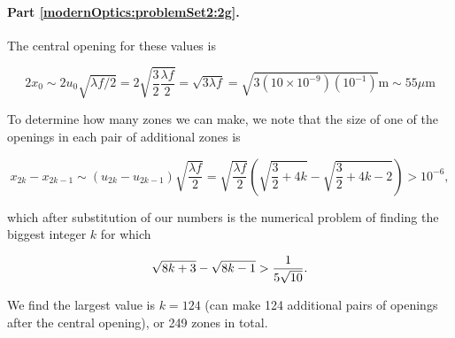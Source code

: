{\paragraph{Part \ref{modernOptics:problemSet2:2g}.  }

The central opening for these values is

\begin{dmath}\label{eqn:modernOptics:ProblemSet2:P2:340}
2 x_0 
\sim 2 u_0 \sqrt{ \lambda f/2 }
= 2 \sqrt{ \frac{3}{2} \frac{\lambda f}{2} }
= \sqrt{ 3 \lambda f }
= \sqrt{ 3 (10 \times 10^{-9})(10^{-1}) } \text{m}
\sim 55 \mu \text{m}
\end{dmath}

To determine how many zones we can make, we note that the size of one of the openings in each pair of additional zones is

\begin{dmath}\label{eqn:modernOptics:ProblemSet2:P2:360}
x_{2k} - x_{2k-1} 
\sim 
(u_{2k} - u_{2k-1} ) 
\sqrt{ \frac{\lambda f}{2} } 
=
\sqrt{ \frac{\lambda f}{2} } 
\left( 
\sqrt{ \frac{3}{2} + 4 k }
-\sqrt{ \frac{3}{2} + 4 k - 2 }
\right) > 10^{-6},
\end{dmath}

which after substitution of our numbers is the numerical problem of finding the biggest integer $k$ for which

\begin{dmath}\label{eqn:modernOptics:ProblemSet2:P2:340b}
\sqrt{ 8 k + 3 } - \sqrt{ 8 k - 1 } > \inv{5 \sqrt{10}}.
\end{dmath}

We find the largest value is $k = 124$ (can make 124 additional pairs of openings after the central opening), or 249 zones in total.

}
